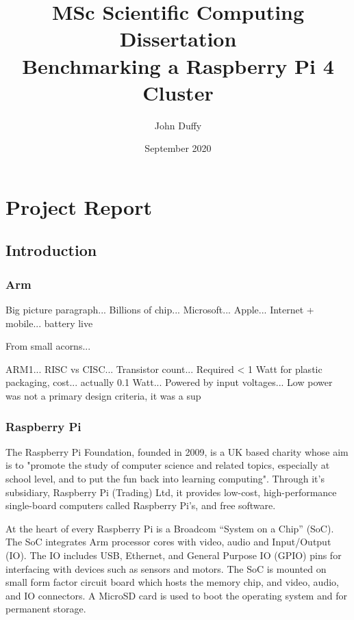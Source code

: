 \documentclass{report}
\title{MSc Scientific Computing Dissertation\\Benchmarking a Raspberry Pi 4 Cluster}
\author{John Duffy}
\date{September 2020}
\begin{document}
\maketitle

\tableofcontents


%
%
\part{Project Report}


%
%
\chapter{Introduction}


%
%
\section{Arm}

Big picture paragraph...
Billions of chip... 
Microsoft...
Apple...
Internet + mobile... battery live

From small acorns...

ARM1...
RISC vs CISC...
Transistor count...
Required < 1 Watt for plastic packaging, cost... actually 0.1 Watt...
Powered by input voltages...
Low power was not a primary design criteria, it was a sup 


%
%
\section{Raspberry Pi}

The Raspberry Pi Foundation, founded in 2009, is a UK based charity whose aim is to "promote the study of computer science and related topics, especially at school level, and to put the fun back into learning computing". Through it's subsidiary, Raspberry Pi (Trading) Ltd, it provides low-cost, high-performance single-board computers called Raspberry Pi's, and free software.

At the heart of every Raspberry Pi is a Broadcom ``System on a Chip'' (SoC). The SoC integrates Arm processor cores with video, audio and Input/Output (IO). The IO includes USB, Ethernet, and General Purpose IO (GPIO) pins for interfacing with devices such as sensors and motors. The SoC is mounted on small form factor circuit board which hosts the memory chip, and video, audio, and IO connectors. A MicroSD card is used to boot the operating system and for permanent storage.
\end{document}
